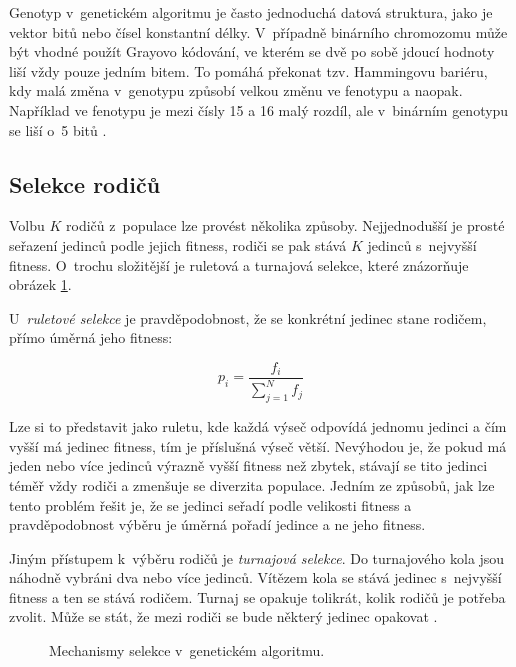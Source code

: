 Genotyp v~genetickém algoritmu je často jednoduchá datová struktura, jako je vektor bitů nebo čísel konstantní délky. V~případně binárního chromozomu může být vhodné použít Grayovo kódování, ve kterém se dvě po sobě jdoucí hodnoty liší vždy pouze jedním bitem. To pomáhá překonat tzv. Hammingovu bariéru, kdy malá změna v~genotypu způsobí velkou změnu ve fenotypu a naopak. Například ve fenotypu je mezi čísly 15 a 16 malý rozdíl, ale v~binárním genotypu se liší o~5 bitů \cite{HandbookGA}.


\subsection{Selekce rodičů}

Volbu $K$ rodičů z~populace lze provést několika způsoby. Nejjednodušší je prosté seřazení jedinců podle jejich fitness, rodiči se pak stává $K$ jedinců s~nejvyšší fitness. O~trochu složitější je ruletová a turnajová selekce, které znázorňuje obrázek \ref{obrSelekce}.

U~\emph{ruletové selekce} je pravděpodobnost, že se konkrétní jedinec stane rodičem, přímo úměrná jeho fitness:

\begin{equation}
p_i = \frac{f_i}{\sum_{j=1}^N{f_j}}
\end{equation}

\noindent{}Lze si to představit jako ruletu, kde každá výseč odpovídá jednomu jedinci a čím vyšší má jedinec fitness, tím je příslušná výseč větší. Nevýhodou je, že pokud má jeden nebo více jedinců výrazně vyšší fitness než zbytek, stávají se tito jedinci téměř vždy rodiči a zmenšuje se diverzita populace. Jedním ze způsobů, jak lze tento problém řešit je, že se jedinci seřadí podle velikosti fitness a pravděpodobnost výběru je úměrná pořadí jedince a ne jeho fitness.

Jiným přístupem k~výběru rodičů je \emph{turnajová selekce}. Do turnajového kola jsou náhodně vybráni dva nebo více jedinců. Vítězem kola se stává jedinec s~nejvyšší fitness a ten se stává rodičem. Turnaj se opakuje tolikrát, kolik rodičů je potřeba zvolit. Může se stát, že mezi rodiči se bude některý jedinec opakovat \cite{Modra}.


\begin{figure}[hbt]
    \centering
    \hfill
    \hfill
    \caption{Mechanismy selekce v~genetickém algoritmu.}
    \label{obrSelekce}
\end{figure}



